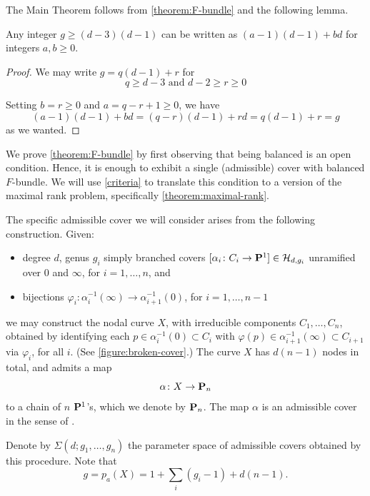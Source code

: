 \documentclass[11pt, two side, letterpaper, final]{amsart}
\renewcommand{\P}{{\bf P}}
\newcommand {\from}{\colon}
\renewcommand{\phi}{\varphi}
\newcommand{\chain}[1]{\P_{#1}}
\begin{document}
The Main Theorem follows from \cref{theorem:F-bundle} and the following lemma.
\begin{lemma}
Any integer $g\geq (d-3)(d-1)$ can be written as $(a-1)(d-1)+bd$ for integers $a,b\geq 0$.
\end{lemma}
\begin{proof}
We may write $g=q(d-1)+r$ for 
\[
	q \geq d-3 \text{ and } d-2\geq r \geq 0
\]

Setting $b=r\geq 0$ and $a=q-r+1\geq 0$, we have
\[
	(a-1)(d-1)+bd=(q-r)(d-1)+rd=q(d-1)+r=g
\]
as we wanted.
\end{proof}


We prove \cref{theorem:F-bundle} by first observing that being balanced is an open condition. Hence, it is enough to exhibit a single (admissible) cover with balanced $F$-bundle.  We will use \cref{criteria}
to translate this condition to a version of the maximal rank problem, specifically \cref{theorem:maximal-rank}.

The specific admissible cover we will consider arises from the following construction. Given:
\begin{itemize}
  \item degree $d$, genus $g_i$ simply branched covers
  $[\alpha_i\from C_i \to \P^1] \in \mathcal{H}_{d,g_i}$ unramified over
  $0$ and $\infty$, for $i=1,\ldots, n$,  and
  \item bijections $\phi_i:\alpha_i^{-1}(\infty) \to \alpha_{i+1}^{-1}(0)$, for $i=1,\ldots,n-1$
 \end{itemize}
 we may construct the nodal curve $X$, with irreducible components $C_1,\ldots, C_n$, obtained by identifying each $p \in \alpha_i^{-1}(0) \subset C_i$ with $ \phi(p) \in \alpha_{i+1}^{-1}(\infty) \subset C_{i+1}$ via $\phi_{i}$, for all $i$. (See \cref{figure:broken-cover}.) The curve $X$ has $d(n-1)$ nodes in total, and admits a map 
\[
\alpha \from X \to \chain{n}
\]
 to a chain of $n$ $\P^1$'s, which we denote by $\chain{n}$. The map $\alpha$ is an admissible cover in the sense of \cite{harris_kodaira_1982}. 
 
 Denote by
 $\Sigma(d;g_1,\ldots, g_n)$ the parameter space of admissible covers obtained by this procedure. Note that 
 \begin{equation}\label{eq:genus-of-admissible-cover}
 	g =p_a(X) = 1+ \sum_i (g_i -1) + d(n-1).
 \end{equation}
\end{document}
